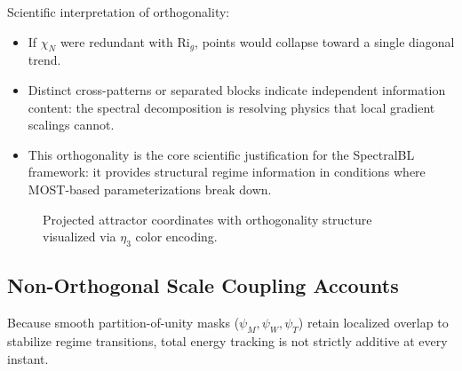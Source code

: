 \documentclass[11pt,a4paper]{article}
\begin{document}
Scientific interpretation of orthogonality:
\begin{itemize}
    \item If $\chi_N$ were redundant with $\mathrm{Ri}_g$, points would collapse toward a single diagonal trend.
    \item Distinct cross-patterns or separated blocks indicate independent information content: the spectral decomposition is resolving physics that local gradient scalings cannot.
    \item This orthogonality is the core scientific justification for the SpectralBL framework: it provides structural regime information in conditions where MOST-based parameterizations break down.
\end{itemize}

\begin{figure}[htbp]
    \centering
    \caption{Projected attractor coordinates with orthogonality structure visualized via $\eta_3$ color encoding.}
    \label{fig:spectral_orthogonality_cases-99}
\end{figure}

\subsection{Non-Orthogonal Scale Coupling Accounts}

Because smooth partition-of-unity masks ($\psi_M,\psi_W,\psi_T$) retain localized overlap to stabilize regime transitions, total energy tracking is not strictly additive at every instant.
\end{document}
